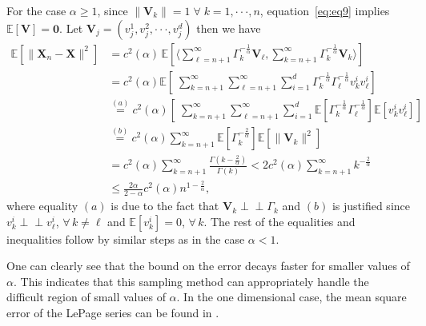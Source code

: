 For the case $\alpha\geq1$, since $\|\mathbf{V}_k\|=1\;\forall \;k=1,\cdot\cdot\cdot,n$, equation~\eqref{eq:eq9} implies $\mathbb{E}[\mathbf{V}]=\mathbf{0}$. Let $\mathbf{V}_j=(v_j^{1},v_j^{2},\cdot\cdot\cdot,v_j^{d})$ then we have
\begin{align}
\mathbb{E} \left[ \|\mathbf{X}_n - \mathbf{X}\|^2 \right]
&= c^{2}(\alpha)\,
\mathbb{E}\left[
    ⟨
    \sum_{\ell=n+1}^{\infty}\Gamma_k^{-\frac{1}{\alpha}}\mathbf{V}_{\ell},
    \sum_{k=n+1}^{\infty}\Gamma_k^{-\frac{1}{\alpha}}\mathbf{V}_k
    ⟩
\right]\\
&=c^{2}(\alpha)\mathbb{E}\left[\;\sum_{k=n+1}^{\infty}\sum_{\ell=n+1}^{\infty}\sum_{i=1}^{d}\Gamma_k^{-\frac{1}{\alpha}}\Gamma_{\ell}^{-\frac{1}{\alpha}}v_{k}^{i}v_{\ell}^{i}\right]\\
&\overset{(a)}{=}c^{2}(\alpha)\left[\;\sum_{k=n+1}^{\infty}\sum_{\ell=n+1}^{\infty}\sum_{i=1}^{d}\mathbb{E}\left[\Gamma_k^{-\frac{1}{\alpha}}\Gamma_{\ell}^{-\frac{1}{\alpha}}\right]\mathbb{E}\left[v_{k}^{i}v_{\ell}^{i}\right]\right] \\
&\overset{(b)}{=}c^{2}(\alpha)\sum_{k=n+1}^{\infty}\mathbb{E}\left[\Gamma_k^{-\frac{2}{\alpha}}\right]\mathbb{E}\left[\|\mathbf{V}_k\|^2\right]\\
&=c^{2}(\alpha)\sum_{k=n+1}^{\infty}\frac{\Gamma(k-\frac{2}{\alpha})}{\Gamma(k)}<2c^{2}(\alpha)\sum_{k=n+1}^{\infty}k^{-\frac{2}{\alpha}}\nonumber\\
&\leq\frac{2\alpha}{2-\alpha}c^{2}(\alpha)n^{1-\frac{2}{\alpha}}, \nonumber
\end{align}
where equality $(a)$ is due to the fact that $\mathbf{V}_k \perp\!\!\!\perp \Gamma_{k}$ and $(b)$ is justified since $v_k^{i} \perp\!\!\!\perp v^{i}_{\ell}$, $\forall \, k\neq\ell$ and $\mathbb{E}[v^{i}_k]=0$, $\forall \,k$. The rest of the equalities and inequalities follow by similar steps as in the case $\alpha<1$.


One can clearly see that the bound on the error decays faster for smaller values of $\alpha$. This indicates that this sampling method can appropriately handle the difficult region of small values of $\alpha$. In the one dimensional case, the mean square error of the LePage series can be found in \cite{JanickiAleksander1992Ciot}.
